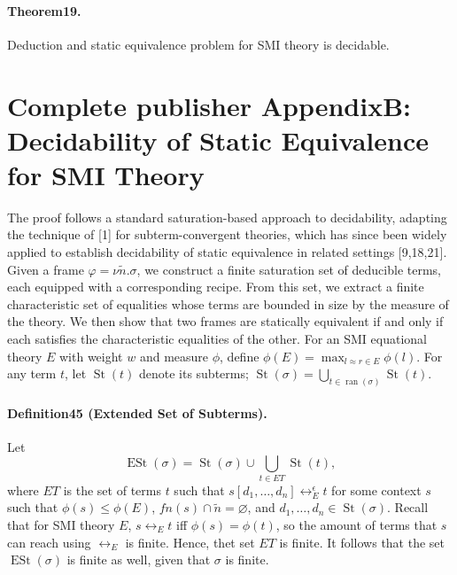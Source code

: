 \documentclass[10pt,a4paper]{amsart}
\begin{document}
\paragraph{Theorem19.} Deduction and static equivalence problem for SMI theory is decidable.

\section*{Complete publisher AppendixB: Decidability of Static Equivalence for SMI Theory}
The proof follows a standard saturation-based approach to decidability, adapting the technique of [1] for subterm-convergent theories, which has since been widely applied to establish decidability of static equivalence in related settings [9,18,21].
Given a frame $\varphi=\nu\tilde n.\sigma$, we construct a finite saturation set of deducible terms, each equipped with a corresponding recipe. From this set, we extract a finite characteristic set of equalities whose terms are bounded in size by the measure of the theory. We then show that two frames are statically equivalent if and only if each satisfies the characteristic equalities of the other.
For an SMI equational theory $E$ with weight $w$ and measure $\phi$, define $\phi(E)=\max_{l\approx r\in E}\phi(l)$. For any term $t$, let $\operatorname{St}(t)$ denote its subterms; $\operatorname{St}(\sigma)=\bigcup_{t\in\operatorname{ran}(\sigma)}\operatorname{St}(t)$.
\paragraph{Definition45 (Extended Set of Subterms).} Let
\[
\operatorname{ESt}(\sigma)=\operatorname{St}(\sigma)\cup\bigcup_{t\in ET}\operatorname{St}(t),
\]
where $ET$ is the set of terms $t$ such that $s[d_1,\ldots,d_n]\leftrightarrow_E^\epsilon t$ for some context $s$ such that $\phi(s)\le\phi(E)$, $fn(s)\cap\tilde n=\varnothing$, and $d_1,\ldots,d_n\in\operatorname{St}(\sigma)$.
Recall that for SMI theory $E$, $s\leftrightarrow_Et$ iff $\phi(s)=\phi(t)$, so the amount of terms that $s$ can reach using $\leftrightarrow_E$ is finite. Hence, thet set $ET$ is finite. It follows that the set $\operatorname{ESt}(\sigma)$ is finite as well, given that $\sigma$ is finite.
\end{document}
